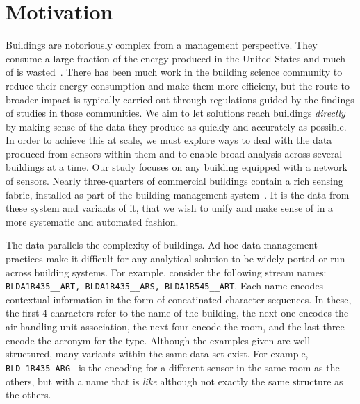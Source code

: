 \section{Motivation}
\label{sec:motivation}

Buildings are notoriously complex from a management perspective.  They consume a large fraction
of the energy produced in the United States and much of is wasted~\cite{next10_waste}.  
There has been
much work in the building science community to reduce their energy consumption and make them more
efficieny, but the route to broader impact is typically carried out through regulations guided
by the findings of studies in those communities.%
We aim to let solutions reach buildings \emph{directly} by making sense of the data they produce
as quickly and accurately as possible.
In order to achieve this at scale, we must explore ways to deal with the data produced
from sensors within them and to enable broad analysis across several buildings at a time. Our study
focuses on any building equipped with a network of sensors.  Nearly 
three-quarters of commercial buildings contain a rich sensing fabric, installed as part
of the building management system~\cite{epa}.  
It is the data from these system and variants of it, that
we wish to unify and make sense of in a more systematic and automated fashion.

%
The data parallels the complexity of buildings. Ad-hoc data management practices
make it difficult for any analytical solution to be widely ported or run across building
systems.  For example, consider the following stream names: \texttt{BLDA1R435\_\_ART,
BLDA1R435\_\_ARS, BLDA1R545\_\_ART}. Each name encodes contextual information in the form
of concatinated character sequences. In these, the first 4 characters refer to the 
name of the building, the next one encodes the air handling unit association, the next 
four encode the room,
and the last three encode the acronym for the type.  Although the examples given are well
structured, many variants within the same data set exist.  For example, \texttt{BLD\_1R435\_ARG\_}
is the encoding for a different sensor in the same room as the others, but with a name
that is \emph{like} although not exactly the same structure as the others.

